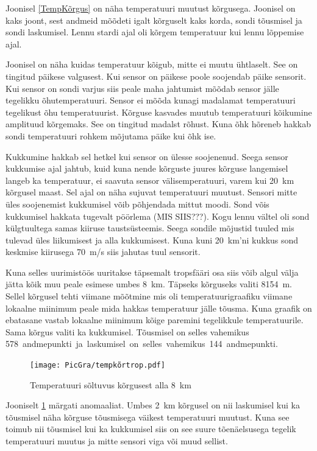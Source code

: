 \documentclass{trkut}%
\begin{document}
Joonisel \ref{TempKõrgus} on näha temperatuuri muutust kõrgusega. Joonisel on kaks joont, sest andmeid mõõdeti igalt kõrguselt kaks korda, sondi tõusmisel ja sondi laskumisel. Lennu stardi ajal oli kõrgem temperatuur kui lennu lõppemise ajal.

Joonisel on näha kuidas temperatuur kõigub, mitte ei muutu ühtlaselt. See on tingitud päikese valgusest. Kui sensor on päikese poole soojendab päike sensorit. Kui sensor on sondi varjus siis peale maha jahtumist mõõdab sensor jälle tegelikku õhutemperatuuri. Sensor ei mõõda kunagi madalamat temperatuuri tegelikust õhu temperatuurist. Kõrguse kasvades muutub temperatuuri kõikumine amplituud kõrgemaks. See on tingitud madalst rõhust. Kuna õhk hõreneb hakkab sondi temperatuuri rohkem mõjutama päike kui õhk ise.

Kukkumine hakkab sel hetkel kui sensor on ülesse soojenenud. Seega sensor kukkumise ajal jahtub, kuid kuna nende kõrguste juures kõrguse langemisel langeb ka temperatuur, ei saavuta sensor välisemperatuuri, varem kui \SI{20}{km} kõrgusel maast. Sel ajal on näha sujuvat temperatuuri muutust. Sensori mitte üles soojenemist kukkumisel võib põhjendada mittut moodi. Sond võis kukkumisel hakkata tugevalt pöörlema (MIS SIIS???). Kogu lennu vältel oli sond külgtuultega samas kiiruse taustsüsteemis. Seega sondile mõjustid tuuled mis tulevad üles liikumisest ja alla kukkumisest. Kuna kuni \SI{20}{km}'ni kukkus sond keskmise kiirusega \SI{70}{m/s} siis jahutas tuul sensorit.

Kuna selles uurimistöös uuritakse täpsemalt tropsfääri osa siis võib algul välja jätta kõik muu peale esimese umbes \SI{8}{km}. Täpseks kõrguseks valiti \SI{8154}{m}. Sellel kõrgusel tehti viimane mõõtmine mis oli temperatuurigraafiku viimane lokaalne miinimum peale mida hakkas temperatuur jälle tõusma. Kuna graafik on ebatasane vastab lokaalne miinimum kõige paremini tegelikkule temperatuurile. Sama kõrgus valiti ka kukkumisel. Tõusmisel on selles vahemikus \SI{578} andmepunkti ja laskumisel on selles vahemikus \SI{144} andmepunkti.

\begin{figure}[h]
	\texttt{[image: PicGra/tempkõrtrop.pdf]}
	\caption{Temperatuuri sõltuvus kõrgusest alla \SI{8}{km}}
	\label{tempkõrtrop}%
\end{figure}

Jooniselt \ref{tempkõrtrop} märgati anomaaliat. Umbes \SI{2}{km} kõrgusel on nii laskumisel kui ka tõusmisel näha kõrguse tõusmisega väikest temperatuuri muutust. Kuna see toimub nii tõusmisel kui ka kukkumisel siis on see suure tõenäelsusega tegelik temperatuuri muutus ja mitte sensori viga või muud sellist.
\end{document}
